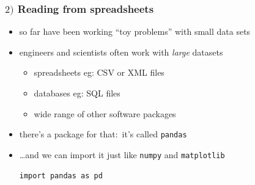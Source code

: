 \documentclass[english,14pt]{beamer}
\begin{document}
%
%
%
%
%
%
%
%
%
%
%
%
%
%


\begin{frame}[fragile]

\frametitle{$2)$ Reading from spreadsheets}

\begin{itemize}
    \item so far have been working ``toy problems'' with small data sets
    \item engineers and scientists often work with \emph{large} datasets
        \begin{itemize}
            \item spreadsheets eg: CSV or XML files
            \item databases eg: SQL files 
            \item wide range of other software packages
        \end{itemize}
    \item there's a package for that:~it's called \texttt{pandas}
    \item[] \ldots and we can import it just like \texttt{numpy} and \texttt{matplotlib}
\begin{lstlisting}[style=CStyle]
import pandas as pd
\end{lstlisting}
\end{itemize}

\end{frame}
\end{document}
